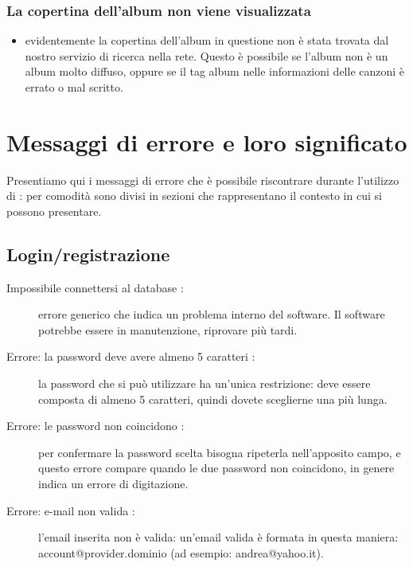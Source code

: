 \subsection*{La copertina dell'album non viene visualizzata}
\begin{itemize}
  \item evidentemente la copertina dell'album in questione non \`e stata
  trovata dal nostro servizio di ricerca nella rete. Questo \`e possibile se
  l'album non \`e un album molto diffuso, oppure se il tag album nelle
  informazioni delle canzoni \`e errato o mal scritto.
\end{itemize}

\appendix %
\chapter{Messaggi di errore e loro significato}
\thispagestyle{fancy}
Presentiamo qui i messaggi di errore che \`e possibile riscontrare durante
l'utilizzo di : per comodit\`a sono divisi in sezioni che
rappresentano il contesto in cui si possono presentare.
\section{Login/registrazione}
\begin{description}
	\item[Impossibile connettersi al database :] errore generico che
	indica un problema interno del software. Il software potrebbe essere in manutenzione,
	riprovare pi\`u tardi.
	\item[Errore: la password deve avere almeno 5 caratteri :] la password
	che si pu\`o utilizzare ha un'unica restrizione: deve essere composta di almeno 5
	caratteri, quindi dovete sceglierne una pi\`u lunga.
	\item [Errore: le password non coincidono :] per confermare la
	password scelta bisogna ripeterla nell'apposito campo, e questo errore compare
	quando le due password non coincidono, in genere indica un errore di
	digitazione.
	\item[Errore: e-mail non valida :] l'email inserita non \`e valida:
	un'email valida \`e formata in questa maniera: account@provider.dominio (ad
	esempio: andrea@yahoo.it).
\end{description}

